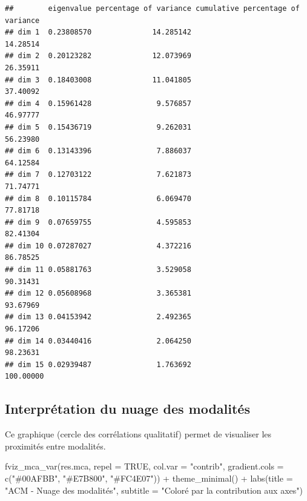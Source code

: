 \documentclass[
]{article}
\newenvironment{Shaded}{\begin{snugshade}}{\end{snugshade}}
\newcommand{\AttributeTok}[1]{\textcolor[rgb]{0.77,0.63,0.00}{#1}}
\newcommand{\ConstantTok}[1]{\textcolor[rgb]{0.00,0.00,0.00}{#1}}
\newcommand{\FunctionTok}[1]{\textcolor[rgb]{0.00,0.00,0.00}{#1}}
\newcommand{\NormalTok}[1]{#1}
\newcommand{\SpecialCharTok}[1]{\textcolor[rgb]{0.00,0.00,0.00}{#1}}
\newcommand{\StringTok}[1]{\textcolor[rgb]{0.31,0.60,0.02}{#1}}
\begin{document}
\begin{verbatim}
##        eigenvalue percentage of variance cumulative percentage of variance
## dim 1  0.23808570              14.285142                          14.28514
## dim 2  0.20123282              12.073969                          26.35911
## dim 3  0.18403008              11.041805                          37.40092
## dim 4  0.15961428               9.576857                          46.97777
## dim 5  0.15436719               9.262031                          56.23980
## dim 6  0.13143396               7.886037                          64.12584
## dim 7  0.12703122               7.621873                          71.74771
## dim 8  0.10115784               6.069470                          77.81718
## dim 9  0.07659755               4.595853                          82.41304
## dim 10 0.07287027               4.372216                          86.78525
## dim 11 0.05881763               3.529058                          90.31431
## dim 12 0.05608968               3.365381                          93.67969
## dim 13 0.04153942               2.492365                          96.17206
## dim 14 0.03440416               2.064250                          98.23631
## dim 15 0.02939487               1.763692                         100.00000
\end{verbatim}

\hypertarget{interpruxe9tation-du-nuage-des-modalituxe9s}{%
\subsection{Interprétation du nuage des
modalités}\label{interpruxe9tation-du-nuage-des-modalituxe9s}}

Ce graphique (cercle des corrélations qualitatif) permet de visualiser
les proximités entre modalités.

\begin{Shaded}
\begin{Highlighting}[]
\FunctionTok{fviz\_mca\_var}\NormalTok{(res.mca, }\AttributeTok{repel =} \ConstantTok{TRUE}\NormalTok{, }\AttributeTok{col.var =} \StringTok{"contrib"}\NormalTok{, }
             \AttributeTok{gradient.cols =} \FunctionTok{c}\NormalTok{(}\StringTok{"\#00AFBB"}\NormalTok{, }\StringTok{"\#E7B800"}\NormalTok{, }\StringTok{"\#FC4E07"}\NormalTok{)) }\SpecialCharTok{+}
  \FunctionTok{theme\_minimal}\NormalTok{() }\SpecialCharTok{+}
  \FunctionTok{labs}\NormalTok{(}\AttributeTok{title =} \StringTok{"ACM {-} Nuage des modalités"}\NormalTok{, }\AttributeTok{subtitle =} \StringTok{"Coloré par la contribution aux axes"}\NormalTok{)}
\end{Highlighting}
\end{Shaded}
\end{document}
